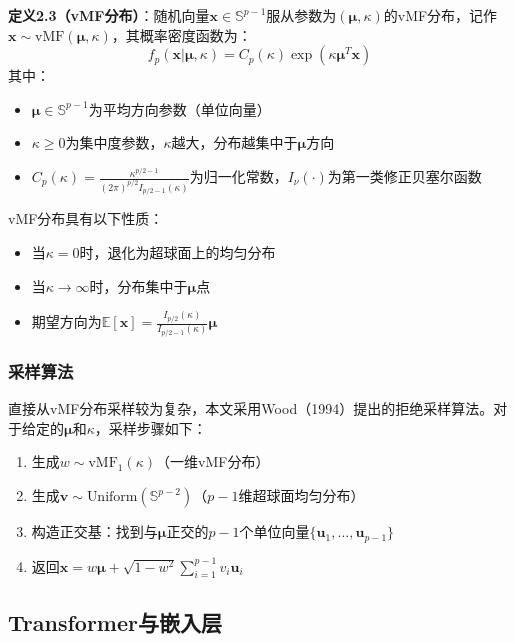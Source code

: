 \documentclass[a4paper,12pt]{article}
\begin{document}
\textbf{定义2.3（vMF分布）}：随机向量$\mathbf{x} \in \mathbb{S}^{p-1}$服从参数为$(\boldsymbol{\mu}, \kappa)$的vMF分布，记作$\mathbf{x} \sim \text{vMF}(\boldsymbol{\mu}, \kappa)$，其概率密度函数为：
\begin{equation}
f_p(\mathbf{x}|\boldsymbol{\mu}, \kappa) = C_p(\kappa) \exp(\kappa \boldsymbol{\mu}^T \mathbf{x})
\end{equation}
其中：
\begin{itemize}
  \item $\boldsymbol{\mu} \in \mathbb{S}^{p-1}$为平均方向参数（单位向量）
  \item $\kappa \geq 0$为集中度参数，$\kappa$越大，分布越集中于$\boldsymbol{\mu}$方向
  \item $C_p(\kappa) = \frac{\kappa^{p/2-1}}{(2\pi)^{p/2} I_{p/2-1}(\kappa)}$为归一化常数，$I_\nu(\cdot)$为第一类修正贝塞尔函数
\end{itemize}

vMF分布具有以下性质：
\begin{itemize}
  \item 当$\kappa = 0$时，退化为超球面上的均匀分布
  \item 当$\kappa \rightarrow \infty$时，分布集中于$\boldsymbol{\mu}$点
  \item 期望方向为$\mathbb{E}[\mathbf{x}] = \frac{I_{p/2}(\kappa)}{I_{p/2-1}(\kappa)} \boldsymbol{\mu}$
\end{itemize}

\subsubsection{采样算法}

直接从vMF分布采样较为复杂，本文采用Wood（1994）提出的拒绝采样算法。对于给定的$\boldsymbol{\mu}$和$\kappa$，采样步骤如下：

\begin{enumerate}
  \item 生成$w \sim \text{vMF}_1(\kappa)$（一维vMF分布）
  \item 生成$\mathbf{v} \sim \text{Uniform}(\mathbb{S}^{p-2})$（$p-1$维超球面均匀分布）
  \item 构造正交基：找到与$\boldsymbol{\mu}$正交的$p-1$个单位向量$\{\mathbf{u}_1, \ldots, \mathbf{u}_{p-1}\}$
  \item 返回$\mathbf{x} = w\boldsymbol{\mu} + \sqrt{1-w^2} \sum_{i=1}^{p-1} v_i \mathbf{u}_i$
\end{enumerate}

\subsection{Transformer与嵌入层}
\end{document}
